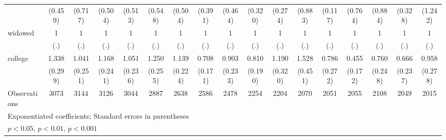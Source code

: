 {\begin{tabular}{l*{16}{c}}
                    &     (0.459)         &     (0.717)         &     (0.504)         &     (0.513)         &     (0.548)         &     (0.504)         &     (0.391)         &     (0.464)         &     (0.320)         &     (0.274)         &     (0.883)         &     (0.117)         &     (0.764)         &     (0.884)         &     (0.328)         &     (1.242)         \\
[1em]
widowed             &           1         &           1         &           1         &           1         &           1         &           1         &           1         &           1         &           1         &           1         &           1         &           1         &           1         &           1         &           1         &           1         \\
                    &         (.)         &         (.)         &         (.)         &         (.)         &         (.)         &         (.)         &         (.)         &         (.)         &         (.)         &         (.)         &         (.)         &         (.)         &         (.)         &         (.)         &         (.)         &         (.)         \\
[1em]
college             &       1.338         &       1.041         &       1.168         &       1.051         &       1.250         &       1.139         &       0.708         &       0.903         &       0.810         &       1.190         &       1.528         &       0.786         &       0.455\sym{*}  &       0.760         &       0.666         &       0.958         \\
                    &     (0.299)         &     (0.251)         &     (0.241)         &     (0.236)         &     (0.255)         &     (0.224)         &     (0.171)         &     (0.233)         &     (0.190)         &     (0.320)         &     (0.451)         &     (0.272)         &     (0.172)         &     (0.248)         &     (0.237)         &     (0.278)         \\
\hline
Observations        &        3073         &        3144         &        3126         &        3044         &        2887         &        2638         &        2586         &        2478         &        2254         &        2204         &        2070         &        2051         &        2055         &        2108         &        2049         &        2015         \\
\hline\hline
\multicolumn{17}{l}{\footnotesize Exponentiated coefficients; Standard errors in parentheses}\\
\multicolumn{17}{l}{\footnotesize \sym{*} \(p<0.05\), \sym{**} \(p<0.01\), \sym{***} \(p<0.001\)}\\
\end{tabular}
}
